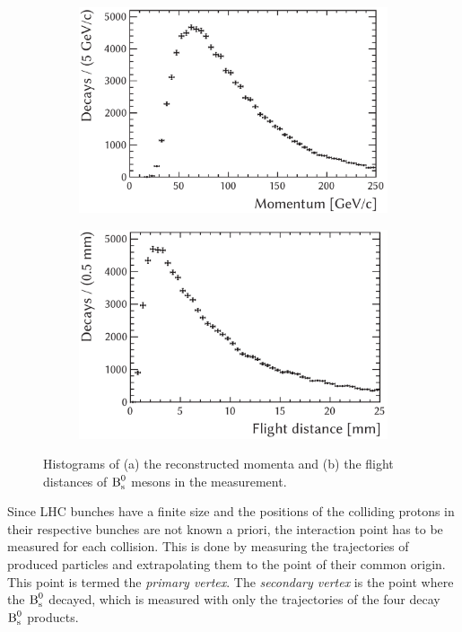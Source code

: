 \begin{figure}[tbhp]
  \centering
  \begin{subfigure}{0.497\textwidth}
    \includegraphics[width=\textwidth]{graphics/intro/BMomentum}
    \caption{}
    \label{fig:introHists_BMomentum}
  \end{subfigure}%
  \hfill%
  \begin{subfigure}{0.497\textwidth}
    \includegraphics[width=\textwidth]{graphics/intro/flightDist}
    \caption{}
    \label{fig:introHists_flightDist}
  \end{subfigure}
  \caption{Histograms of (a) the reconstructed momenta and (b) the flight distances of $\text{B}_\text{s}^\text{0}$ mesons in the \BstoJpsiKK{} measurement.}
  \label{fig:introHists}
\end{figure}

Since LHC bunches have a finite size and the positions of the colliding protons in their respective bunches are not known a priori, the
interaction point has to be measured for each collision. This is done by measuring the trajectories of produced particles and extrapolating
them to the point of their common origin. This point is termed the \emph{primary vertex}. The \emph{secondary vertex} is the point where
the $\text{B}_\text{s}^\text{0}$ decayed, which is measured with only the trajectories of the four decay $\text{B}_\text{s}^\text{0}$ products.

